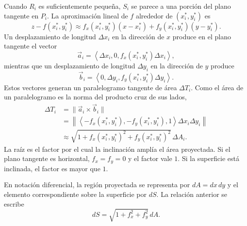 Cuando $R_i$ es suficientemente pequeña, $S_i$ se parece a una porción del plano tangente en $P_i$. La aproximación lineal de $f$ alrededor de $(x_i^*,y_i^*)$ es
\[
z-f(x_i^*,y_i^*)
\approx f_x(x_i^*,y_i^*)(x-x_i^*)
+f_y(x_i^*,y_i^*)(y-y_i^*).
\]
Un desplazamiento de longitud $\Delta x_i$ en la dirección de $x$ produce en el plano tangente el vector
\[
\vec a_i=
\left\langle\Delta x_i,0,
f_x(x_i^*,y_i^*)\Delta x_i\right\rangle,
\]
mientras que un desplazamiento de longitud $\Delta y_i$ en la dirección de $y$ produce
\[
\vec b_i=
\left\langle0,\Delta y_i,
f_y(x_i^*,y_i^*)\Delta y_i\right\rangle.
\]
Estos vectores generan un paralelogramo tangente de área $\Delta T_i$. Como el área de un paralelogramo es la norma del producto cruz de sus lados,
\begin{align*}
\Delta T_i
&=\lVert\vec a_i\times\vec b_i\rVert\\
&=\left\lVert
\left\langle-f_x(x_i^*,y_i^*),
-f_y(x_i^*,y_i^*),1\right\rangle
\Delta x_i\Delta y_i
\right\rVert\\
&\approx
\sqrt{1+f_x(x_i^*,y_i^*)^2+f_y(x_i^*,y_i^*)^2}\,\Delta A_i.
\end{align*}
La raíz es el factor por el cual la inclinación amplía el área proyectada. Si el plano tangente es horizontal, $f_x=f_y=0$ y el factor vale $1$. Si la superficie está inclinada, el factor es mayor que $1$.

En notación diferencial, la región proyectada se representa por $dA=dx\,dy$ y el elemento correspondiente sobre la superficie por $dS$. La relación anterior se escribe
\[
dS=\sqrt{1+f_x^2+f_y^2}\,dA.
\]

